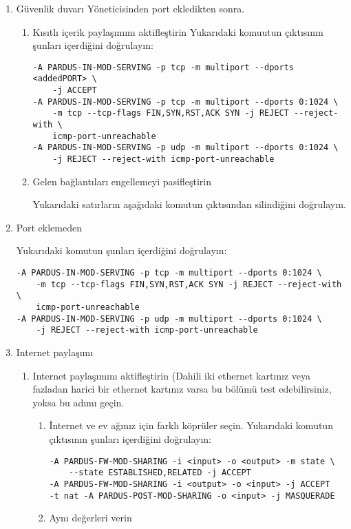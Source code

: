 \documentclass[a4paper,10pt]{article}
\begin{document}
\begin{enumerate}
\begin{enumerate}
     \item Güvenlik duvarı Yöneticisinden port ekledikten sonra.
        \begin{enumerate}
        \item Kısıtlı içerik paylaşımını aktifleştirin
            	Yukarıdaki komuutun çıktısının şunları içerdiğini doğrulayın: 
\begin{verbatim}
-A PARDUS-IN-MOD-SERVING -p tcp -m multiport --dports <addedPORT> \
    -j ACCEPT
-A PARDUS-IN-MOD-SERVING -p tcp -m multiport --dports 0:1024 \
    -m tcp --tcp-flags FIN,SYN,RST,ACK SYN -j REJECT --reject-with \
    icmp-port-unreachable
-A PARDUS-IN-MOD-SERVING -p udp -m multiport --dports 0:1024 \
    -j REJECT --reject-with icmp-port-unreachable
\end{verbatim} 
        \item Gelen bağlantıları engellemeyi pasifleştirin

              Yukarıdaki satırların aşağıdaki komutun çıktısından silindiğini doğrulayın.
        \end{enumerate}
    \item Port eklemeden

        Yukarıdaki komutun şunları içerdiğini doğrulayın:

\begin{verbatim}
-A PARDUS-IN-MOD-SERVING -p tcp -m multiport --dports 0:1024 \
    -m tcp --tcp-flags FIN,SYN,RST,ACK SYN -j REJECT --reject-with \
    icmp-port-unreachable
-A PARDUS-IN-MOD-SERVING -p udp -m multiport --dports 0:1024 \
    -j REJECT --reject-with icmp-port-unreachable
\end{verbatim} 


\item Internet paylaşımı
    \begin{enumerate}
    \item Internet paylaşımını aktifleştirin
    	(Dahili iki ethernet kartınız veya fazladan harici bir ethernet kartınız varsa bu bölümü test edebilirsiniz, yoksa bu adımı geçin.
        \begin{enumerate}

        \item İnternet ve ev ağınız için farklı köprüler seçin.
            	Yukarıdaki komutun çıktısının şunları içerdiğini doğrulayın:
\begin{verbatim}
-A PARDUS-FW-MOD-SHARING -i <input> -o <output> -m state \
    --state ESTABLISHED,RELATED -j ACCEPT
-A PARDUS-FW-MOD-SHARING -i <output> -o <input> -j ACCEPT
-t nat -A PARDUS-POST-MOD-SHARING -o <input> -j MASQUERADE
\end{verbatim} 
        \item Aynı değerleri verin


\end{enumerate}
\end{enumerate}
\end{enumerate}
\end{enumerate}
\end{document}
